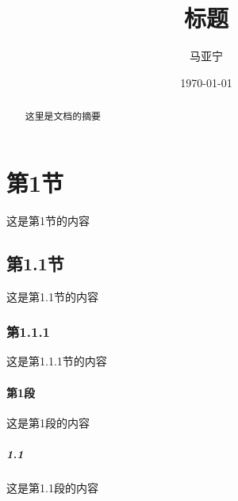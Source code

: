 \documentclass{article}
\begin{document}
\title{标题}                        
\author{马亚宁}
\date{\today}
\maketitle     
\clearpage


\begin{abstract}
    这里是文档的摘要
\end{abstract}
\clearpage


\tableofcontents  %
\clearpage


\section{第1节}
这是第1节的内容
\subsection{第1.1节}
这是第1.1节的内容
\subsubsection{第1.1.1}
这是第1.1.1节的内容
\paragraph{第1段}
这是第1段的内容
\subparagraph{1.1}
这是第1.1段的内容



\end{document}
